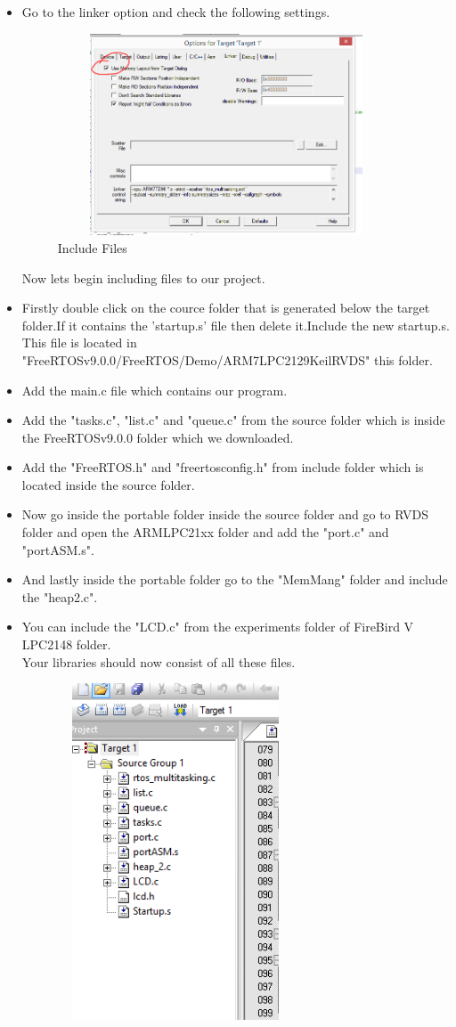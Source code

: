 \documentclass[11pt,a4paper]{book}
\begin{document}
\begin{enumerate}
\begin{itemize}
\item Go to the linker option and check the following settings.
\begin{figure}[H]
	\centering
	\includegraphics[width=10cm,height=6cm]{linker.PNG}
	\caption{Include Files}
\end{figure}
Now lets begin including files to our project.
\item Firstly double click on the cource folder that is generated below the target folder.If it contains the 'startup.s' file then delete it.Include the new startup.s. This file is located in \\"FreeRTOSv9.0.0/FreeRTOS/Demo/ARM7LPC2129KeilRVDS" this folder.
\item Add the main.c file which contains our program.
\item Add the "tasks.c", "list.c" and "queue.c" from the source folder which is inside the FreeRTOSv9.0.0 folder which we downloaded.
\item Add the "FreeRTOS.h" and "freertosconfig.h" from include folder which is located inside the source folder.
\item Now go inside the portable folder inside the source folder and go to RVDS folder and open the ARMLPC21xx folder and add the "port.c" and "portASM.s".
\item And lastly inside the portable folder go to the "MemMang" folder and include the "heap2.c".
\item You can include the "LCD.c" from the experiments folder of FireBird V LPC2148 folder.\\
Your libraries should now consist of all these files.
\begin{figure}[H]
	\centering
	\includegraphics[width=7cm,height=10cm]{libraries.PNG}

\end{figure}
\end{itemize}
\end{enumerate}
\end{document}
